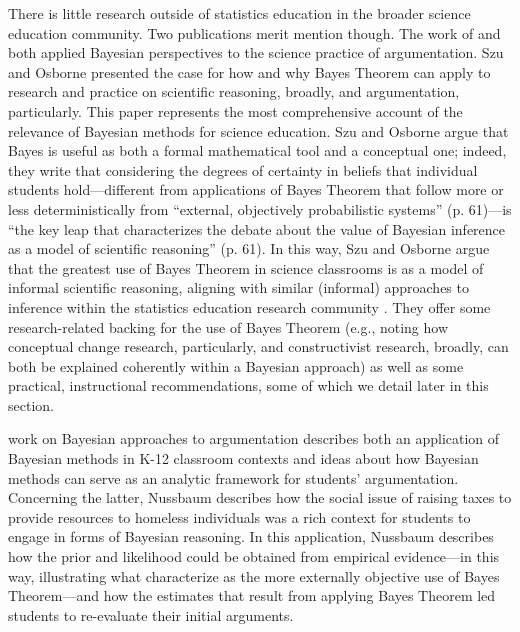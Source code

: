 \documentclass[man]{apa7}
\begin{document}
There is little research outside of statistics education in the broader science education community. Two publications merit mention though. The work of \textcite{so12} and \textcite{n11} both applied Bayesian perspectives to the science practice of argumentation. Szu and Osborne presented the case for how and why Bayes Theorem can apply to research and practice on scientific reasoning, broadly, and argumentation, particularly. This paper represents the most comprehensive account of the relevance of Bayesian methods for science education. Szu and Osborne argue that Bayes is useful as both a formal mathematical tool and a conceptual one; indeed, they write that considering the degrees of certainty in beliefs that individual students hold—different from applications of Bayes Theorem that follow more or less deterministically from ``external, objectively probabilistic systems'' (p. 61)—is ``the key leap that characterizes the debate about the value of Bayesian inference as a model of scientific reasoning'' (p. 61). In this way, Szu and Osborne argue that the greatest use of Bayes Theorem in science classrooms is as a model of informal scientific reasoning, aligning with similar (informal) approaches to inference within the statistics education research community \parencite{batanero2016research, mr18}. They offer some research-related backing for the use of Bayes Theorem (e.g., noting how conceptual change research, particularly, and constructivist research, broadly, can both be explained coherently within a Bayesian approach) as well as some practical, instructional recommendations, some of which we detail later in this section.

\textcite{n11} work on Bayesian approaches to argumentation describes both an application of Bayesian methods in K-12 classroom contexts and ideas about how Bayesian methods can serve as an analytic framework for students’ argumentation. Concerning the latter, Nussbaum describes how the social issue of raising taxes to provide resources to homeless individuals was a rich context for students to engage in forms of Bayesian reasoning. In this application, Nussbaum describes how the prior and likelihood could be obtained from empirical evidence—in this way, illustrating what \textcite{so12} characterize as the more externally objective use of Bayes Theorem—and how the estimates that result from applying Bayes Theorem led students to re-evaluate their initial arguments. 
\end{document}
